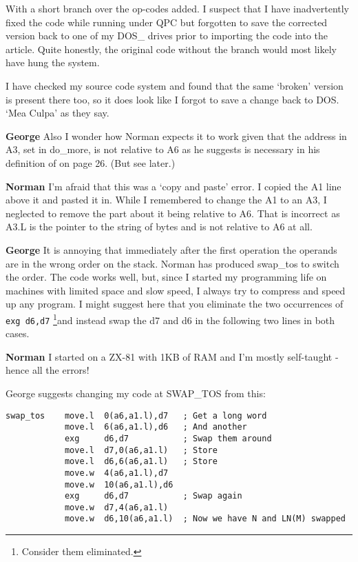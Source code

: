With a short branch over the op-{}codes added. I suspect that I have
    inadvertently fixed the code while running under QPC but forgotten to save
    the corrected version back to one of my DOS\_ drives prior to importing the
    code into the article. Quite honestly, the original code without the
    branch would most likely have hung the system.

I have checked my source code system and found that the same
    `broken' version is present there too, so it does look like I forgot to
    save a change back to DOS. `Mea Culpa' as they say.

{\bf George} 
Also I wonder how Norman expects
    it to work given that the address in A3, set in do\_more, is not relative
    to A6 as he suggests is necessary in his definition of  on page
    26. (But see later.)



{\bf Norman} 
I'm afraid that this was a `copy and paste' error. I copied the A1 line above it and pasted it in. While I
    remembered to change the A1 to an A3, I neglected to remove the part about
    it being relative to A6. That is incorrect as A3.L is the pointer to the
    string of bytes and is not relative to A6 at all.



{\bf George} 
It is annoying that immediately
    after the first operation the operands are in the wrong order on the
    stack. Norman has produced swap\_tos to switch the order. The code works
    well, but, since I started my programming life on machines with limited
    space and slow speed, I always try to compress and speed up any program. I
    might suggest here that you eliminate the two occurrences of \lstinline{exg d6,d7}
    \footnote{Consider them eliminated.}and instead swap the d7 and d6 in the following two lines in both
    cases.



{\bf Norman} 
I started on a ZX-{}81 with 1KB of RAM and I'm mostly self-{}taught -{} hence all the errors!



George suggests changing my code at SWAP\_TOS from this:

\begin{lstlisting}[firstnumber=93,caption={ANYROOT - Swap\_Tos - Original Code}]
swap_tos    move.l  0(a6,a1.l),d7   ; Get a long word
            move.l  6(a6,a1.l),d6   ; And another
            exg     d6,d7           ; Swap them around
            move.l  d7,0(a6,a1.l)   ; Store
            move.l  d6,6(a6,a1.l)   ; Store
            move.w  4(a6,a1.l),d7
            move.w  10(a6,a1.l),d6
            exg     d6,d7           ; Swap again
            move.w  d7,4(a6,a1.l)
            move.w  d6,10(a6,a1.l)  ; Now we have N and LN(M) swapped
\end{lstlisting}

